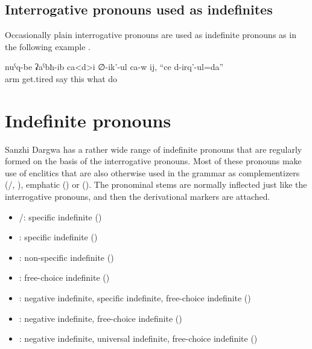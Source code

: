 \subsection{Interrogative pronouns used as indefinites}
\label{ssec:Interrogative pronouns as indefinites}

Occasionally plain interrogative pronouns are used as indefinite pronouns as in the following example .

\begin{exe}
	\ex	\label{ex:He says, my hands got tired, I do something}
	\gll	nuˁq-be	ʡaˁbħ-ib ca<d>i	∅-ik'-ul ca-w	ij,	``ce	d-irq'-ul=da''\\
		arm	get.tired 	say 	this	what	do\\
	\glt	{}
\end{exe}



\section{Indefinite pronouns}
\label{sec:Indefinite pronouns}

Sanzhi Dargwa has a rather wide range of indefinite pronouns that are regularly formed on the basis of the interrogative pronouns. Most of these pronouns make use of enclitics that are also otherwise used in the grammar as complementizers (\slash{}, ), emphatic  () or  (). The pronominal stems are normally inflected just like the interrogative pronouns, and then the derivational markers are attached.\pagebreak

\begin{itemize}
	\item	{}\slash{}: specific indefinite ()
		\item	{}: specific indefinite ()
	\item	{}: non-specific indefinite ()
	\item	{}: free-choice indefinite ()
	\item	{}: negative indefinite, specific indefinite, free-choice indefinite ()
		\item	{}: negative indefinite, free-choice indefinite ()
	\item	{}: negative indefinite, universal indefinite, free-choice indefinite ()
\end{itemize}

